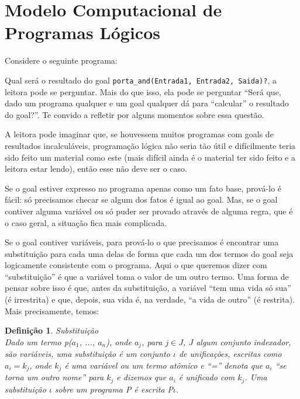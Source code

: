 \documentclass{article}
\newtheorem{definition}{Definição}[section]
\theoremstyle{remark}
\theoremstyle{theorem}
\begin{document}
\section{Modelo Computacional de Programas Lógicos}

Considere o seguinte programa:




Qual será o resultado do goal {\tt porta\_and(Entrada1, Entrada2, Saida)?}, a leitora pode se perguntar. Mais do que isso, ela pode se perguntar ``Será que, dado um programa qualquer e um goal qualquer dá para ``calcular'' o resultado do goal?''. Te convido a refletir por alguns momentos sobre essa questão.


A leitora pode imaginar que, se houvessem muitos programas com goals de resultados incalculáveis, programação lógica não seria tão útil e difícilmente teria sido feito um material como este (mais difícil ainda é o material ter sido feito e a leitora estar lendo), então esse não deve ser o caso.

Se o goal estiver expresso no programa apenas como um fato base, prová-lo é fácil: só precisamos checar se algum dos fatos é igual ao goal. Mas, se o goal contiver alguma variável ou só puder ser provado através de alguma regra, que é o caso geral, a situação fica mais complicada.

Se o goal contiver variáveis, para prová-lo o que precisamos é encontrar uma substituição para cada uma delas de forma que cada um dos termos do goal seja logicamente consistente com o programa. Aqui o que queremos dizer com ``substituição'' é que a variável toma o valor de um outro termo. Uma forma de pensar sobre isso é que, antes da substituição, a variável ``tem uma vida só sua'' (é irrestrita) e que, depois, sua vida é, na verdade, ``a vida de
outro'' (é restrita). Mais precisamente, temos:\\

\begin{definition}{Substituição}\\
  Dado um termo {\it p($a_1$, ..., $a_n$)}, onde $a_j$, para $j \in J$, $J$ algum conjunto indexador, são variáveis, uma substituição é um conjunto $\iota$ de \textit{unificações}, escritas como $a_i = k_j$, onde $k_j$ é uma variável ou um termo atômico e ``='' denota que $a_i$ ``se torna um outro nome'' para $k_j$ e dizemos que $a_i$ é unificado com $k_j$.
  Uma substituição $\iota$ sobre um programa P é escrita P$\iota$.
\end{definition}
\end{document}
